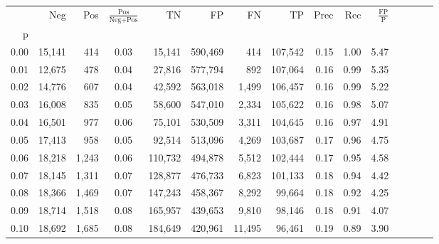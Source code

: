\begin{tabular}{rrrcrrrrrrrrrrr}
\toprule
{} &     Neg &    Pos & $\frac{\text{Pos}}{\text{Neg}+\text{Pos}}$ &       TN &       FP &       FN &       TP &  Prec &   Rec & $\frac{\text{FP}}{\text{P}}$ \\
p    &         &        &                                            &          &          &          &          &       &       &                              \\
\midrule
0.00 &  15,141 &    414 &                                       0.03 &   15,141 &  590,469 &      414 &  107,542 &  0.15 &  1.00 &                         5.47 \\
0.01 &  12,675 &    478 &                                       0.04 &   27,816 &  577,794 &      892 &  107,064 &  0.16 &  0.99 &                         5.35 \\
0.02 &  14,776 &    607 &                                       0.04 &   42,592 &  563,018 &    1,499 &  106,457 &  0.16 &  0.99 &                         5.22 \\
0.03 &  16,008 &    835 &                                       0.05 &   58,600 &  547,010 &    2,334 &  105,622 &  0.16 &  0.98 &                         5.07 \\
0.04 &  16,501 &    977 &                                       0.06 &   75,101 &  530,509 &    3,311 &  104,645 &  0.16 &  0.97 &                         4.91 \\
0.05 &  17,413 &    958 &                                       0.05 &   92,514 &  513,096 &    4,269 &  103,687 &  0.17 &  0.96 &                         4.75 \\
0.06 &  18,218 &  1,243 &                                       0.06 &  110,732 &  494,878 &    5,512 &  102,444 &  0.17 &  0.95 &                         4.58 \\
0.07 &  18,145 &  1,311 &                                       0.07 &  128,877 &  476,733 &    6,823 &  101,133 &  0.18 &  0.94 &                         4.42 \\
0.08 &  18,366 &  1,469 &                                       0.07 &  147,243 &  458,367 &    8,292 &   99,664 &  0.18 &  0.92 &                         4.25 \\
0.09 &  18,714 &  1,518 &                                       0.08 &  165,957 &  439,653 &    9,810 &   98,146 &  0.18 &  0.91 &                         4.07 \\
0.10 &  18,692 &  1,685 &                                       0.08 &  184,649 &  420,961 &   11,495 &   96,461 &  0.19 &  0.89 &                         3.90 \\

\end{tabular}
